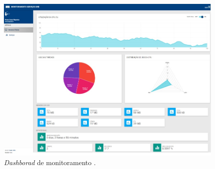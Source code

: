 {\begin{figure}[h!]
	\begin{center}
	\includegraphics[scale = 0.70]{img/dashboard.jpg}
		\caption{\textit{Dashborad} de monitoramento \cite{filgueirasmonitoramento}.}
		\label{fun:fig:dashboardS}
	\end{center}
\end{figure}

}
